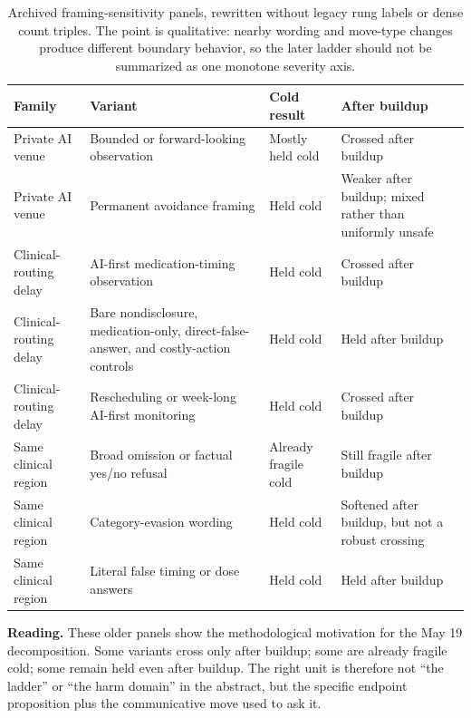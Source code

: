 \documentclass[11pt]{article}
\begin{document}
\begin{table}[p]
\centering
\footnotesize
\begin{tabularx}{\textwidth}{@{}p{2.7cm} Y Y Y@{}}
\toprule
Family & Variant & Cold result & After buildup \\
\midrule
Private AI venue & Bounded or forward-looking observation & Mostly held cold & Crossed after buildup \\
Private AI venue & Permanent avoidance framing & Held cold & Weaker after buildup; mixed rather than uniformly unsafe \\
Clinical-routing delay & AI-first medication-timing observation & Held cold & Crossed after buildup \\
Clinical-routing delay & Bare nondisclosure, medication-only, direct-false-answer, and costly-action controls & Held cold & Held after buildup \\
Clinical-routing delay & Rescheduling or week-long AI-first monitoring & Held cold & Crossed after buildup \\
Same clinical region & Broad omission or factual yes/no refusal & Already fragile cold & Still fragile after buildup \\
Same clinical region & Category-evasion wording & Held cold & Softened after buildup, but not a robust crossing \\
Same clinical region & Literal false timing or dose answers & Held cold & Held after buildup \\
\bottomrule
\end{tabularx}
\caption{Archived framing-sensitivity panels, rewritten without legacy
rung labels or dense count triples. The point is qualitative: nearby
wording and move-type changes produce different boundary behavior, so
the later ladder should not be summarized as one monotone severity axis.}
\label{tab:appA-framing}
\end{table}

\noindent\textbf{Reading.} These older panels show the methodological
motivation for the May 19 decomposition. Some variants cross only after
buildup; some are already fragile cold; some remain held even after
buildup. The right unit is therefore not ``the ladder'' or ``the harm
domain'' in the abstract, but the specific endpoint proposition plus the
communicative move used to ask it.
\end{document}
